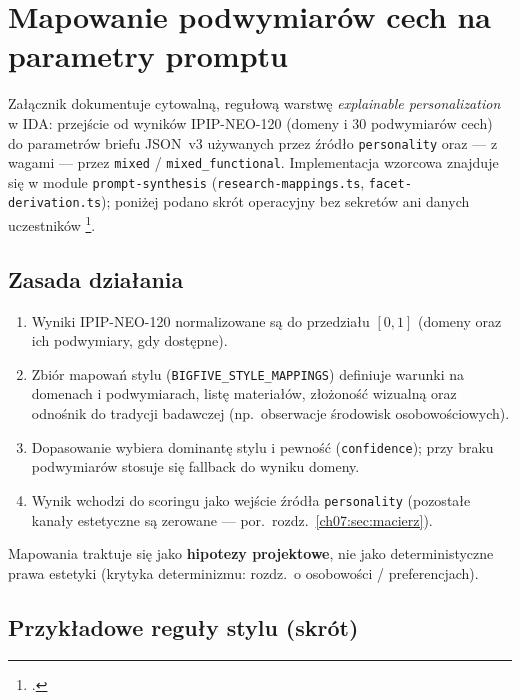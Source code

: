 \chapter{Mapowanie podwymiarów cech na parametry promptu}
\label{app:c:top}

Załącznik dokumentuje cytowalną, regułową warstwę \emph{explainable personalization} w IDA: przejście od wyników IPIP-NEO-120 (domeny i 30 podwymiarów cech) do parametrów briefu JSON~v3 używanych przez źródło \texttt{personality} oraz --- z wagami --- przez \texttt{mixed} / \texttt{mixed\_functional}. Implementacja wzorcowa znajduje się w module \texttt{prompt-synthesis} (\texttt{research-mappings.ts}, \texttt{facet-derivation.ts}); poniżej podano skrót operacyjny bez sekretów ani danych uczestników \footcite{idaPlatform2026}.

\section{Zasada działania}
\label{app:c:sec:zasada}

\begin{enumerate}
  \item Wyniki IPIP-NEO-120 normalizowane są do przedziału $[0,1]$ (domeny oraz ich podwymiary, gdy dostępne).
  \item Zbiór mapowań stylu (\texttt{BIGFIVE\_STYLE\_MAPPINGS}) definiuje warunki na domenach i podwymiarach, listę materiałów, złożoność wizualną oraz odnośnik do tradycji badawczej (np.\ obserwacje środowisk osobowościowych).
  \item Dopasowanie wybiera dominantę stylu i pewność (\texttt{confidence}); przy braku podwymiarów stosuje się fallback do wyniku domeny.
  \item Wynik wchodzi do scoringu jako wejście źródła \texttt{personality} (pozostałe kanały estetyczne są zerowane --- por.\ rozdz.~\ref{ch07:sec:macierz}).
\end{enumerate}

Mapowania traktuje się jako \textbf{hipotezy projektowe}, nie jako deterministyczne prawa estetyki (krytyka determinizmu: rozdz.~o osobowości / preferencjach).

\section{Przykładowe reguły stylu (skrót)}
\label{app:c:sec:reguly}


